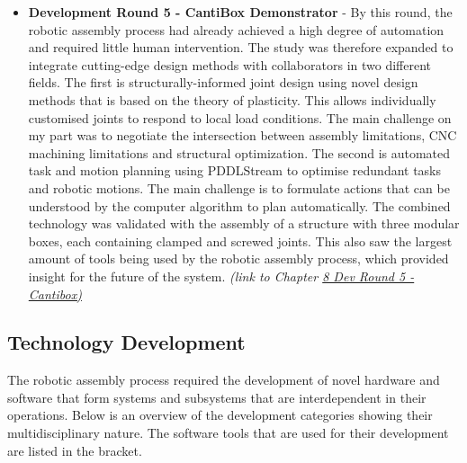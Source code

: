 \documentclass[11pt]{book}
\begin{document}
\begin{itemize}
	\item \textbf{Development Round 5 - CantiBox Demonstrator} - By this round, the robotic assembly process had already achieved a high degree of automation and required little human intervention. The study was therefore expanded to integrate cutting-edge design methods with collaborators in two different fields. The first is structurally-informed joint design using novel design methods that is based on the theory of plasticity. This allows individually customised joints to respond to local load conditions. The main challenge on my part was to negotiate the intersection between assembly limitations, CNC machining limitations and structural optimization. The second is automated task and motion planning using PDDLStream to optimise redundant tasks and robotic motions. The main challenge is to formulate actions that can be understood by the computer algorithm to plan automatically. The combined technology was validated with the assembly of a structure with three modular boxes, each containing clamped and screwed joints. This also saw the largest amount of tools being used by the robotic assembly process, which provided insight for the future of the system. \textit{(link to Chapter \underline{8 Dev Round 5 - Cantibox)}}

\end{itemize}
\subsection{Technology Development}

The robotic assembly process required the development of novel hardware and software that form systems and subsystems that are interdependent in their operations. Below is an overview of the development categories showing their multidisciplinary nature. The software tools that are used for their development are listed in the bracket. 
\end{document}

